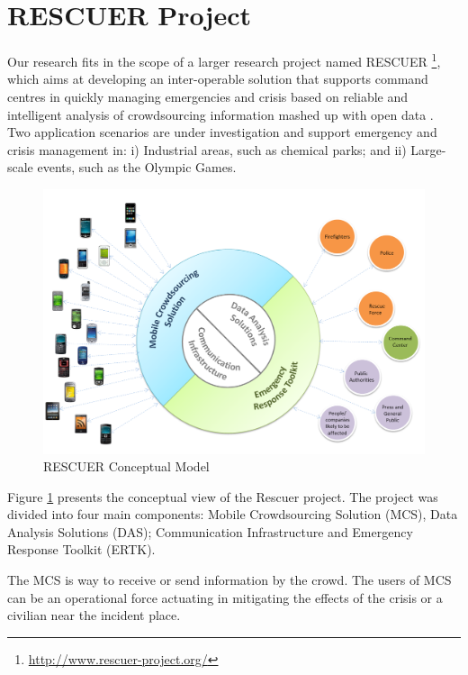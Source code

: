 \label{sec:rescuerNews}

\section{RESCUER Project}

Our research fits in the scope of a larger research project named RESCUER \footnote{\url{http://www.rescuer-project.org/}}, which aims at developing an inter-operable solution that supports command centres in quickly managing emergencies and crisis based on reliable and intelligent analysis of crowdsourcing information mashed up with open data \citep{villela2014smart}\citep{villela2018}. Two application scenarios are under investigation and support emergency and crisis management in: i) Industrial areas, such as chemical parks; and ii) Large-scale events, such as the Olympic Games.

\begin{figure}[ht!]
\begin{center}
  \includegraphics[width=0.75\linewidth, keepaspectratio]{images/rescuerConcept.PNG}
\caption{RESCUER Conceptual Model \citep{villela2014smart}}
\label{fig:rescuerConcept}
\end{center}
\end{figure}

Figure \ref{fig:rescuerConcept} presents the conceptual view of the Rescuer project. The project was divided into four main components: Mobile Crowdsourcing Solution (MCS), Data Analysis Solutions (DAS); Communication Infrastructure and Emergency Response Toolkit (ERTK). 

The MCS \citep{nass2018interaction} is way to receive or send information by the crowd. The users of MCS can be an operational force actuating in mitigating the effects of the crisis or a civilian near the incident place.

